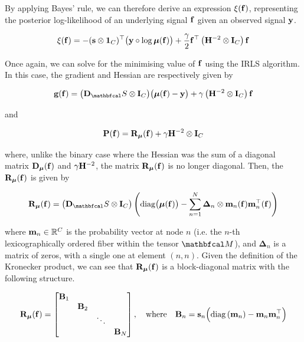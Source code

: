 By applying Bayes' rule, we can therefore derive an expression $\xi(\mathbf{f})$, representing the posterior log-likelihood of an underlying signal $\mathbf{f}$ given an observed signal $\mathbf{y}$. 

\begin{equation*}
    \xi(\mathbf{f}) = - (\mathbf{s} \otimes \mathbf{1}_C)^\top \big(\mathbf{y} \circ \log \boldsymbol{\mu}(\mathbf{f}) \big) + \frac{\gamma}{2} \mathbf{f}^\top \left(\mathbf{H}^{-2} \otimes \mathbf{I}_C\right) \mathbf{f}
\end{equation*}

Once again, we can solve for the minimising value of $\mathbf{f}$ using the IRLS algorithm. In this case, the gradient and Hessian are respectively given by 

\begin{equation}
    \g(\f) = \big(\D_\St \otimes \I_C\big) \big(\muu(\f) - \y\big) + \gamma \left(\HH^{-2} \otimes \I_C\right) \f
\end{equation}

and

\begin{equation}
    \mathbf{P}(\mathbf{f}) = \mathbf{R}_{\boldsymbol{\mu}}(\mathbf{f}) + \gamma \mathbf{H}^{-2} \otimes \mathbf{I}_C
\end{equation}

where, unlike the binary case where the Hessian was the sum of a diagonal matrix $\mathbf{D}_{\boldsymbol{\mu}}(\mathbf{f})$ and $\gamma \mathbf{H}^{-2}$, the matrix $\mathbf{R}_{\boldsymbol{\mu}}(\mathbf{f})$ is no longer diagonal. Then, the $\mathbf{R}_{\boldsymbol{\mu}}(\mathbf{f})$ is given by 

\begin{equation}
    \RR_{\muu}(\f) =  \big(\D_\St \otimes \I_C\big) \left(\Diag{\muu(\f)} - \sum_{n=1}^N \mathbf{\Delta}_{n} \otimes \m_n (\f) \m_n^\top(\f) \right)
\end{equation}

where $\mathbf{m}_n \in \mathbb{R}^C$ is the probability vector at node $n$ (i.e. the $n$-th lexicographically ordered fiber within the tensor $\Mt$), and $\mathbf{\Delta}_{n}$ is a matrix of zeros, with a single one at element $(n, n)$. Given the definition of the Kronecker product, we can see that $\mathbf{R}_{\boldsymbol{\mu}}(\mathbf{f})$ is a block-diagonal matrix with the following structure. 

\begin{equation*}
    \mathbf{R}_{\boldsymbol{\mu}}(\mathbf{f}) = \begin{bmatrix}
        \mathbf{B}_1 & & & \\
        & \mathbf{B}_2 & & \\
        & & \ddots & \\
        & & & \mathbf{B}_N
    \end{bmatrix}, \quad \text{where} \quad \mathbf{B}_n = \mathbf{s}_n \Big(\text{\textup{diag}}\left(\mathbf{m}_n\right) - \mathbf{m}_n \mathbf{m}_n^\top\Big)
\end{equation*}

